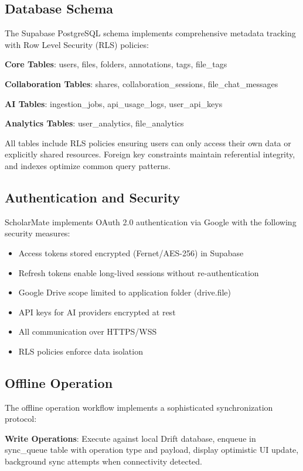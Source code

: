 \documentclass[conference]{IEEEtran}
\begin{document}
\subsection{Database Schema}

The Supabase PostgreSQL schema implements comprehensive metadata tracking with Row Level Security (RLS) policies:

\textbf{Core Tables}: users, files, folders, annotations, tags, file\_tags

\textbf{Collaboration Tables}: shares, collaboration\_sessions, file\_chat\_messages

\textbf{AI Tables}: ingestion\_jobs, api\_usage\_logs, user\_api\_keys

\textbf{Analytics Tables}: user\_analytics, file\_analytics

All tables include RLS policies ensuring users can only access their own data or explicitly shared resources. Foreign key constraints maintain referential integrity, and indexes optimize common query patterns.

\subsection{Authentication and Security}

ScholarMate implements OAuth 2.0 authentication via Google with the following security measures:

\begin{itemize}
\item Access tokens stored encrypted (Fernet/AES-256) in Supabase
\item Refresh tokens enable long-lived sessions without re-authentication
\item Google Drive scope limited to application folder (drive.file)
\item API keys for AI providers encrypted at rest
\item All communication over HTTPS/WSS
\item RLS policies enforce data isolation
\end{itemize}

\subsection{Offline Operation}

The offline operation workflow implements a sophisticated synchronization protocol:

\textbf{Write Operations}: Execute against local Drift database, enqueue in sync\_queue table with operation type and payload, display optimistic UI update, background sync attempts when connectivity detected.
\end{document}

